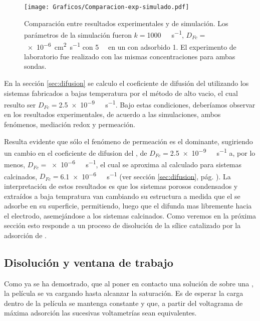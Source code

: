 				\begin{figure}[ht]
					\centering
			 	    \texttt{[image: Graficos/Comparacion-exp-simulado.pdf]}
			        \caption[Simulación EQ comparadas con datos experimentales]{Comparación entre resultados experimentales y de simulación. Los parámetros de la simulación fueron $k=$\SI{1000}{\per\Molar\per\second}, $D_{Fc}=$ \SI{e-6}{\square\cm\per\second} con \fc\space \SI{5}{\milli\Molar} en un \pdm\space con \ru\space adsorbido \SI{1}{\Molar}. El experimento de laboratorio fue realizado con las mismas concentraciones para ambas sondas.}
			        \label{fig:comp_sim_exp}
			      	\end{figure}
		
		En la sección \ref{sec:difusion} se calculo el coeficiente de difusión del \fc\space utilizando los sistemas fabricados a bajas temperatura por el método de alto vacio, el cual resulto ser $D_{Fc}=$\SI{2.5e-9}{\per\Molar\per\second}. Bajo estas condiciones, deberíamos observar en los resultados experimentales, de acuerdo a las simulaciones, ambos fenómenos, mediación redox y permeación.

		Resulta evidente que sólo el fenómeno de permeación es el dominante, sugiriendo un cambio en el coeficiente de difusion del \fc, de $D_{Fc}=$\SI{2.5e-9}{\per\Molar\per\second} a, por lo menos, $D_{Fc}\!=$\SI{e-6}{\per\Molar\per\second}, el cual se aproxima al calculado para sistemas calcinados,  $D_{Fc}=$\SI{6.1e-6}{\per\Molar\per\second} (ver sección \ref{sec:difusion}, pág. \pageref{sec:difusion}). La interpretación de estos resultados es que los sistemas porosos condensados y extraídos a baja tempratura van cambiando su estructura a medida que el \ru\space se adsorbe en su superficie, permitiendo, luego que el \fc\space difunda mas libremente hacia el electrodo, asemejándose a los sistemas calcinados. Como veremos en la próxima sección esto responde a un proceso de disolución de la sílice catalizado por la adsorción de \aminorutenio.

	\subsection{Disolución y ventana de trabajo}

		Como ya se ha demostrado, que al poner en contacto una solución de \ru\space sobre una \pdmF\space, la película se va cargando hasta alcanzar la saturación. Es de esperar la carga dentro de la película se mantenga constante y que, a partir del voltagrama de máxima adsorción las sucesivas voltametrías sean equivalentes.

